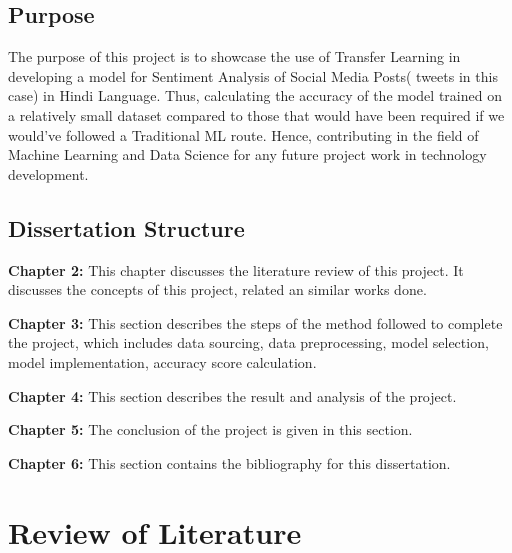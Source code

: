 \documentclass[a4paper, 12pt]{article}
\begin{document}
\begin{sloppypar}
\subsection{Purpose}

The purpose of this project is to showcase the use of Transfer Learning in developing a model for Sentiment Analysis of Social Media Posts( tweets in this case) in Hindi Language. Thus, calculating the accuracy of the model trained on a relatively small dataset compared to those that would have been required if we would've followed a Traditional ML route. Hence, contributing in the field of Machine Learning and Data Science for any future project work in technology development.

\subsection{Dissertation Structure}
\textbf{Chapter 2:} This chapter discusses the literature review of this project. It discusses the concepts of this project, related an similar works done.

\textbf{Chapter 3:} This section describes the steps of the method followed to complete the project, which includes data sourcing, data preprocessing, model selection, model implementation, accuracy score calculation.

\textbf{Chapter 4:} This section describes the result and analysis of the project.

\textbf{Chapter 5:} The conclusion of the project is given in this section.

\textbf{Chapter 6:} This section contains the bibliography for this dissertation.
\clearpage

\section {Review of Literature}
\clearpage
\printbibliography
\clearpage

\end{sloppypar}
\end{document}
